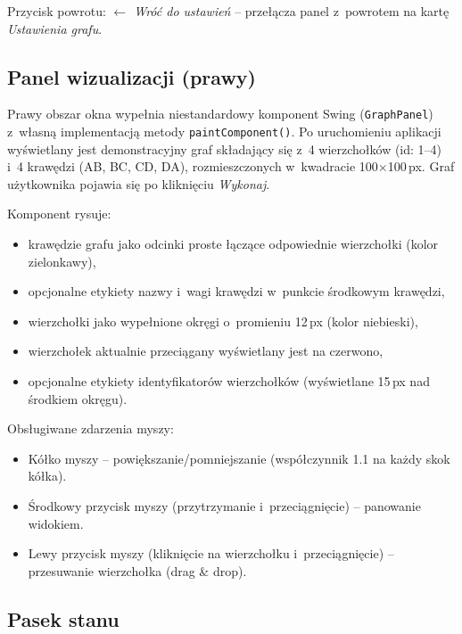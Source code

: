 \documentclass[12pt,a4paper]{article}
\begin{document}
\noindent Przycisk powrotu: \textit{$\leftarrow$ Wróć do ustawień} -- przełącza panel z~powrotem na kartę \textit{Ustawienia grafu}.

\subsection{Panel wizualizacji (prawy)}

Prawy obszar okna wypełnia niestandardowy komponent Swing (\texttt{GraphPanel}) z~własną implementacją metody \texttt{paintComponent()}. Po uruchomieniu aplikacji wyświetlany jest demonstracyjny graf składający się z~4 wierzchołków (id: 1--4) i~4 krawędzi (AB, BC, CD, DA), rozmieszczonych w~kwadracie 100$\times$100\,px. Graf użytkownika pojawia się po kliknięciu \textit{Wykonaj}.

Komponent rysuje:
\begin{itemize}
    \item krawędzie grafu jako odcinki proste łączące odpowiednie wierzchołki (kolor zielonkawy),
    \item opcjonalne etykiety nazwy i~wagi krawędzi w~punkcie środkowym krawędzi,
    \item wierzchołki jako wypełnione okręgi o~promieniu 12\,px (kolor niebieski),
    \item wierzchołek aktualnie przeciągany wyświetlany jest na czerwono,
    \item opcjonalne etykiety identyfikatorów wierzchołków (wyświetlane 15\,px nad środkiem okręgu).
\end{itemize}

Obsługiwane zdarzenia myszy:
\begin{itemize}
    \item Kółko myszy -- powiększanie/pomniejszanie (współczynnik 1.1 na każdy skok kółka).
    \item Środkowy przycisk myszy (przytrzymanie i~przeciągnięcie) -- panowanie widokiem.
    \item Lewy przycisk myszy (kliknięcie na wierzchołku i~przeciągnięcie) -- przesuwanie wierzchołka (drag \& drop).
\end{itemize}

\subsection{Pasek stanu}
\end{document}
